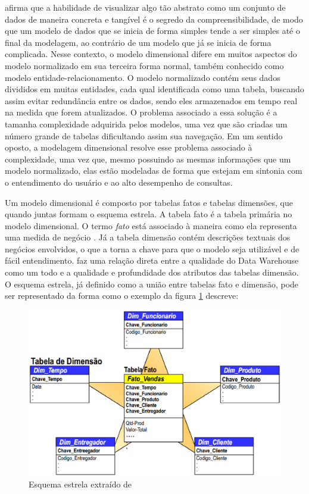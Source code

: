  afirma que a habilidade de visualizar algo tão abstrato como um conjunto de dados  de maneira concreta e tangível é o segredo da compreensibilidade, de modo que um modelo de dados que se inicia de forma simples tende a ser simples até o final da modelagem, ao contrário de um modelo que já se inicia de forma complicada. Nesse contexto, o modelo dimensional difere em muitos aspectos do modelo normalizado em sua terceira forma normal, também conhecido como modelo entidade-relacionamento. O modelo normalizado contém seus dados divididos em muitas entidades, cada qual identificada como uma tabela, buscando assim evitar redundância entre os dados, sendo eles armazenados em tempo real na medida que forem atualizados. O problema associado a essa solução é a tamanha complexidade adquirida pelos modelos, uma vez que são criadas um número grande de tabelas dificultando assim sua navegação. Em um sentido oposto, a modelagem dimensional resolve esse problema associado à complexidade, uma vez que, mesmo possuindo as mesmas informações que um modelo normalizado, elas estão modeladas de forma que estejam em sintonia com o entendimento do usuário e ao alto desempenho de consultas. 

Um modelo dimensional é composto por tabelas fatos e tabelas dimensões, que quando juntas formam o esquema estrela. A tabela fato é a tabela primária no modelo dimensional. O termo \textit{fato} está associado à maneira como ela representa uma medida de negócio \cite{Kimball2002}. Já a tabela dimensão contém descrições textuais dos negócios envolvidos, o que a torna a chave para que o modelo seja utilizável e de fácil entendimento.  faz uma relação direta entre a qualidade do Data Warehouse como um todo e a qualidade e profundidade dos atributos das tabelas dimensão. O esquema estrela, já definido como a união entre tabelas fato e dimensão, pode ser representado da forma como o exemplo da figura \ref{fig:estrela} descreve:
 
\begin{figure}[h!]
\centering
\includegraphics[keepaspectratio=false,scale=0.50]{figuras/figuras_matheus/star.eps}
\caption{Esquema estrela extraído de }
\label{fig:estrela}
\end{figure}
\FloatBarrier
 
